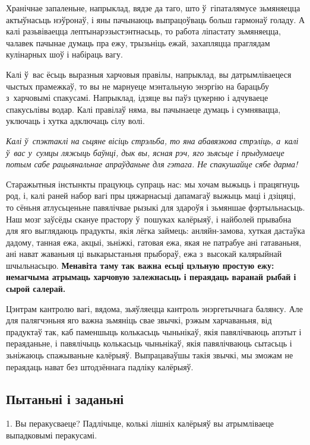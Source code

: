 Хранічнае запаленьне, напрыклад, вядзе да таго, што ў~гіпаталямусе зьмяняецца актыўнасьць нэўронаў, і яны пачынаюць выпрацоўваць больш гармонаў голаду. А калі разьвіваецца лептынарэзыстэнтнасьць, то работа ліпастату зьмяняецца, чалавек пачынае думаць пра ежу, трызьніць ежай, захапляцца праглядам кулінарных шоў і набіраць вагу.

Калі ў~вас ёсьць выразныя харчовыя правілы, напрыклад, вы датрымліваецеся чыстых прамежкаў, то вы не марнуеце мэнтальную энэргію на барацьбу з~харчовымі спакусамі. Напрыклад, ідзяце вы паўз цукерню і адчуваеце спакусьлівы водар. Калі правілаў няма, вы пачынаеце думаць і сумнявацца, уключаць і хутка адключаць сілу волі.

\emph{Калі ў~спэктаклі на сьцяне вісіць стрэльба, то яна абавязкова стрэліць, а~калі ў~вас у~сумцы ляжыць баўнці, дык вы, ясная рэч, яго зьясьце і прыдумаеце потым сабе рацыянальнае апраўданьне для гэтага. Не спакушайце сябе дарма!}

Старажытныя інстынкты працуюць супраць нас: мы хочам выжыць і працягнуць род, і, калі раней набор вагі пры цяжарнасьці дапамагаў выжыць маці і дзіцяці, то сёньня атлусьценьне павялічвае рызыкі для здароўя і зьмяншае фэртыльнасьць. Наш мозг заўсёды скануе прастору ў~пошуках калёрыяў, і найболей прывабна для яго выглядаюць прадукты, якія лёгка займець: анляйн-замова, хуткая дастаўка дадому, танная ежа, акцыі, зьніжкі, гатовая ежа, якая не патрабуе ані гатаваньня, ані нават жаваньня ці выкарыстаньня прыбораў, ежа з~высокай калярыйнай шчыльнасьцю. \textbf{Менавіта таму так важна есьці цэльную простую ежу: немагчыма атрымаць харчовую залежнасьць і пераядаць варанай рыбай і сырой салерай.}

Цэнтрам кантролю вагі, вядома, зьяўляецца кантроль энэргетычнага балянсу. Але для палягчэньня яго важна зьмяніць свае звычкі, рэжым харчаваньня, від прадуктаў так, каб паменшыць колькасьць чыньнікаў, якія павялічваюць апэтыт і пераяданьне, і павялічыць колькасьць чыньнікаў, якія павялічваюць сытасьць і зьніжаюць спажываньне калёрыяў. Выпрацаваўшы такія звычкі, мы зможам не пераядаць нават без штодзённага падліку калёрыяў.

\subsection*{Пытаньні і заданьні}

1. Вы перакусваеце? Падлічыце, колькі лішніх калёрыяў вы атрымліваеце выпадковымі перакусамі.

